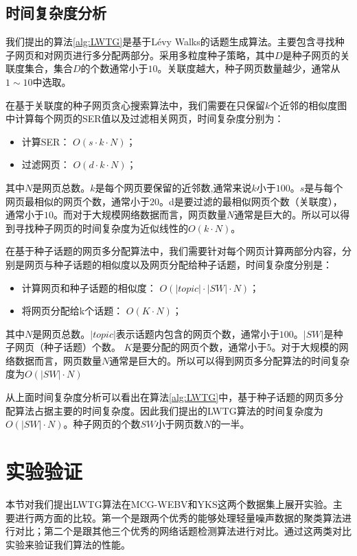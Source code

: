 \subsection{时间复杂度分析}

我们提出的算法\ref{alg:LWTG}是基于L\'evy Walks的话题生成算法。主要包含寻找种子网页和对网页进行多分配两部分。采用多粒度种子策略，其中$D$是种子网页的关联度集合，集合$D$的个数通常小于$10$。关联度越大，种子网页数量越少，通常从$1\sim10$中选取。

在基于关联度的种子网页贪心搜索算法中，我们需要在只保留$k$个近邻的相似度图中计算每个网页的SER值以及过滤相关网页，时间复杂度分别为：
\begin{itemize}
  \item 计算SER： $O(s\cdot k\cdot N)$；
  \item 过滤网页： $O(d\cdot k\cdot N)$；
\end{itemize}
其中$N$是网页总数。$k$是每个网页要保留的近邻数,通常来说$k$小于$100$。$s$是与每个网页最相似的网页个数，通常小于$20$。d是要过滤的最相似网页个数（关联度），通常小于$10$。而对于大规模网络数据而言，网页数量$N$通常是巨大的。所以可以得到寻找种子网页的时间复杂度为近似线性的$O(k\cdot N)$。

在基于种子话题的网页多分配算法中，我们需要针对每个网页计算两部分内容，分别是网页与种子话题的相似度以及网页分配给种子话题，时间复杂度分别是：
\begin{itemize}
  \item 计算网页和种子话题的相似度： $O(|topic|\cdot |SW|\cdot N)$；
  \item 将网页分配给k个话题： $O(K\cdot N)$；
\end{itemize}
其中$N$是网页总数。$|topic|$表示话题内包含的网页个数，通常小于$100$。$|SW|$是种子网页（种子话题）个数。
$K$是要分配的网页个数，通常小于$5$。对于大规模的网络数据而言，网页数量$N$通常是巨大的。所以可以得到网页多分配算法的时间复杂度为$O(|SW|\cdot N)$

从上面时间复杂度分析可以看出在算法\ref{alg:LWTG}中，基于种子话题的网页多分配算法占据主要的时间复杂度。因此我们提出的LWTG算法的时间复杂度为$O(|SW|\cdot N)$。种子网页的个数$SW$小于网页数$N$的一半。



\section{实验验证}
本节对我们提出LWTG算法在MCG-WEBV和YKS这两个数据集上展开实验。主要进行两方面的比较。第一个是跟两个优秀的能够处理轻量噪声数据的聚类算法进行对比；第二个是跟其他三个优秀的网络话题检测算法进行对比。通过这两类对比实验来验证我们算法的性能。

